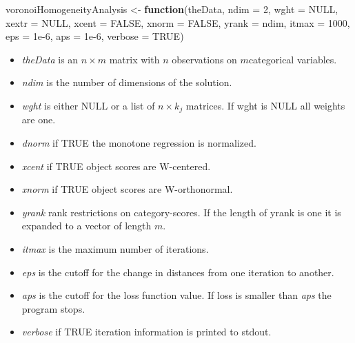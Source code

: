 \documentclass[
  12pt,
  letterpaper,
  DIV=11,
  numbers=noendperiod]{scrartcl}
\newenvironment{Shaded}{\begin{snugshade}}{\end{snugshade}}
\newcommand{\AttributeTok}[1]{\textcolor[rgb]{0.40,0.45,0.13}{#1}}
\newcommand{\ConstantTok}[1]{\textcolor[rgb]{0.56,0.35,0.01}{#1}}
\newcommand{\ControlFlowTok}[1]{\textcolor[rgb]{0.00,0.23,0.31}{\textbf{#1}}}
\newcommand{\DecValTok}[1]{\textcolor[rgb]{0.68,0.00,0.00}{#1}}
\newcommand{\FloatTok}[1]{\textcolor[rgb]{0.68,0.00,0.00}{#1}}
\newcommand{\NormalTok}[1]{\textcolor[rgb]{0.00,0.23,0.31}{#1}}
\newcommand{\OtherTok}[1]{\textcolor[rgb]{0.00,0.23,0.31}{#1}}
\providecommand{\tightlist}{%
  \setlength{\itemsep}{0pt}\setlength{\parskip}{0pt}}
\begin{document}
\begin{Shaded}
\begin{Highlighting}[]
\NormalTok{voronoiHomogeneityAnalysis }\OtherTok{\textless{}{-}} \ControlFlowTok{function}\NormalTok{(theData,  }
                                       \AttributeTok{ndim =} \DecValTok{2}\NormalTok{, }
                                       \AttributeTok{wght =} \ConstantTok{NULL}\NormalTok{,}
                                       \AttributeTok{xextr =} \ConstantTok{NULL}\NormalTok{,}
                                       \AttributeTok{xcent =} \ConstantTok{FALSE}\NormalTok{,}
                                       \AttributeTok{xnorm =} \ConstantTok{FALSE}\NormalTok{,}
                                       \AttributeTok{yrank =}\NormalTok{ ndim,}
                                       \AttributeTok{itmax =} \DecValTok{1000}\NormalTok{,}
                                       \AttributeTok{eps =} \FloatTok{1e{-}6}\NormalTok{,}
                                       \AttributeTok{aps =} \FloatTok{1e{-}6}\NormalTok{,}
                                       \AttributeTok{verbose =} \ConstantTok{TRUE}\NormalTok{)}
\end{Highlighting}
\end{Shaded}

\begin{itemize}
\tightlist
\item
  \emph{theData} is an \(n \times m\) matrix with \(n\) observations on
  \(m\)categorical variables.
\item
  \emph{ndim} is the number of dimensions of the solution.
\item
  \emph{wght} is either NULL or a list of \(n \times k_j\) matrices. If
  wght is NULL all weights are one.
\item
  \emph{dnorm} if TRUE the monotone regression is normalized.
\item
  \emph{xcent} if TRUE object scores are W-centered.
\item
  \emph{xnorm} if TRUE object scores are W-orthonormal.
\item
  \emph{yrank} rank restrictions on category-scores. If the length of
  yrank is one it is expanded to a vector of length \(m\).
\item
  \emph{itmax} is the maximum number of iterations.
\item
  \emph{eps} is the cutoff for the change in distances from one
  iteration to another.
\item
  \emph{aps} is the cutoff for the loss function value. If loss is
  smaller than \emph{aps} the program stops.
\item
  \emph{verbose} if TRUE iteration information is printed to stdout.
\end{itemize}
\end{document}
